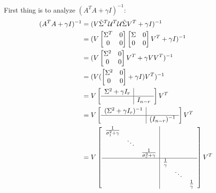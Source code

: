 First thing is to analyze $(A^TA + \gamma I)^{-1}$:
\begin{align*}
(A^TA + \gamma I)^{-1} &= (V\tilde{\Sigma}^T\mathcal{U}^T\mathcal{U}\tilde{\Sigma}V^T + \gamma I)^{-1}\\
&= (V
\begin{bmatrix}
\Sigma^T & 0\\
0 & 0\\
\end{bmatrix}
\begin{bmatrix}
\Sigma & 0\\
0 & 0\\
\end{bmatrix}
V^T + \gamma I)^{-1}\\
&=(V
\begin{bmatrix}
\Sigma^2 & 0\\
0  & 0
\end{bmatrix}
V^T + \gamma VV^T
)^{-1}\\
&= (V(
\begin{bmatrix}
\Sigma^2 & 0\\
0 & 0
\end{bmatrix}
+\gamma I)V^T)^{-1}\\
&= V
\left[
\begin{array}{c|c}
\Sigma^2+\gamma I_r&  \\ \hline 
& I_{n-r}
\end{array}
\right]
V^T\\
&=
V
\left[
\begin{array}{c|c}
(\Sigma^2+\gamma I_r)^{-1}&  \\ \hline 
& (I_{n-r})^{-1}
\end{array}
\right]
V^T\\
&=
V
\left[
\begin{array}{c|c}
\begin{matrix}
\frac{1}{\sigma_1^2+\gamma} & &\\
&\ddots&\\
&&\frac{1}{\sigma_r^2+\gamma}
\end{matrix}&  \\ \hline 
& \begin{matrix}
\frac{1}{\gamma} & &\\
&\ddots&\\
&&\frac{1}{\gamma}
\end{matrix}
\end{array}
\right]
V^T
\end{align*}



